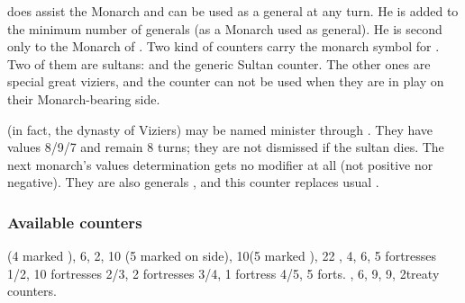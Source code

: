  does assist the Monarch and can be
used as a general  at any turn. He is added
to the minimum number of generals (as a Monarch used as general). He is
second only to the Monarch of \TUR.
\bparag \label{chSpecific:Turkey:Vizier}Two kind of counters carry the monarch
symbol for . Two of them are sultans:
 and the generic Sultan counter. The other ones are
special great viziers, and the \leaderSadrazam counter can not be
used when they are in play on their Monarch-bearing side.

 (in fact, the dynasty of Viziers) may
be named minister through . They have values
8/9/7 and remain 8 turns; they are not dismissed if the sultan dies. The
next monarch's values determination gets no modifier at all (not
positive nor negative).
\bparag They are also generals , and this
counter replaces usual \leaderSadrazam.

\subsubsection{Available counters}
\ARMY (4 marked \Timar), 6\FLEET, 2\corsaire, 10\LDND
(5 marked \Timar on \LD side), 10\LD (5 marked \Timar), 22 \Pashas, 4\NTD,
6\LDENDE, 5 fortresses 1/2, 10 fortresses 2/3, 2 fortresses 3/4, 1
fortress 4/5, 5 forts.
\COL, 6\TP, 9\MNU, 9\TradeFLEET, 2\ROTW treaty
counters.



